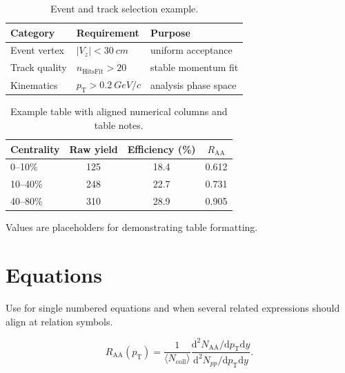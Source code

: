 \begin{table}[htbp]
  \centering
  \caption{Event and track selection example.}
  \label{tab:selection-example}
  \begin{tabular}{lll}
    \toprule
    Category & Requirement & Purpose \\
    \midrule
    Event vertex & $|V_{z}| < \SI{30}{cm}$ & uniform acceptance \\
    Track quality & $n_{\mathrm{HitsFit}} > 20$ & stable momentum fit \\
    Kinematics & $p_{\mathrm{T}} > \SI{0.2}{GeV}/c$ & analysis phase space \\
    \bottomrule
  \end{tabular}
\end{table}

\begin{table}[htbp]
  \centering
  \caption{Example table with aligned numerical columns and table notes.}
  \label{tab:yield-example}
  \begin{threeparttable}
    \begin{tabular}{lS[table-format=3.0]S[table-format=2.1]S[table-format=1.3]}
      \toprule
      Centrality & {Raw yield} & {Efficiency (\%)} & {$R_{\mathrm{AA}}$} \\
      --10\%  & 125 & 18.4 & 0.612 \\
      10--40\% & 248 & 22.7 & 0.731 \\
      40--80\% & 310 & 28.9 & 0.905 \\
      \bottomrule
    \end{tabular}
    \begin{tablenotes}
      \footnotesize
      \item Values are placeholders for demonstrating table formatting.
    \end{tablenotes}
  \end{threeparttable}
\end{table}

\section{Equations}

Use  for single numbered equations and  when several
related expressions should align at relation symbols.

\begin{equation}
  R_{\mathrm{AA}}(p_{\mathrm{T}}) =
  \frac{1}{\langle N_{\mathrm{coll}}\rangle}
  \frac{\mathrm{d}^{2}N_{\mathrm{AA}}/\mathrm{d}p_{\mathrm{T}}\mathrm{d}y}
       {\mathrm{d}^{2}N_{pp}/\mathrm{d}p_{\mathrm{T}}\mathrm{d}y}.
  \label{eq:raa-definition}
\end{equation}

